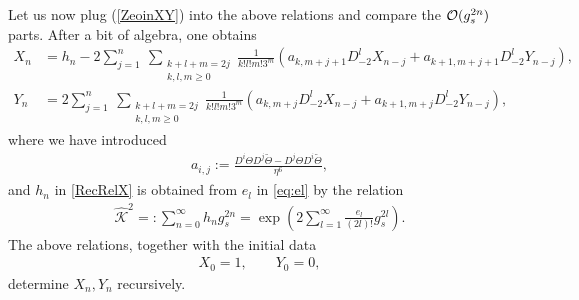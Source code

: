 \documentclass[11pt]{article}
\def\h#1{\widehat{#1}}
\renewcommand{\[}{\begin{eqnarray}}
\renewcommand{\]}{\end{eqnarray}}
\newcommand{\Thetaeven}{\Theta}
\newcommand{\Thetaodd}{{\widetilde{\Theta}}}
\newcommand{\heven}{h}
\begin{document}
%
Let us now plug (\ref{ZeoinXY}) into the above relations
and compare the ${\cal O}(g_s^{2n})$ parts.
After a bit of algebra, one obtains
%
\begin{align}
\label{RecRelX}
X_n &= \heven_n 
 -2\sum_{j=1}^n\ \sum_{\substack{k+l+m=2j\\ k,l,m\ge 0}}
 \frac{1}{k!l!m!3^m}
 \left(a_{k,m+j+1}D_{-2}^l X_{n-j}
      +a_{k+1,m+j+1}D_{-2}^l Y_{n-j}\right),\\
\label{RecRelY}
Y_n &=
  2\sum_{j=1}^n\ \sum_{\substack{k+l+m=2j\\ k,l,m\ge 0}}
 \frac{1}{k!l!m!3^m}
 \left(a_{k,m+j}D_{-2}^l X_{n-j}
      +a_{k+1,m+j}D_{-2}^l Y_{n-j}\right),
\end{align}
%
where we have introduced
%
\begin{align}
a_{i,j}:=
 \frac{D^i\Thetaeven D^j\Thetaodd-D^j\Thetaeven D^i\Thetaodd}{\eta^6},
\end{align}
and $\heven_n$
in \eqref{RecRelX} is obtained from $e_l$ in \eqref{eq:el} by the relation
%
\begin{align}
\label{GenRelheven}
 \h{\mathcal{K}}^2=:\sum_{n=0}^\infty \heven_n g_s^{2n}
=\exp\left(2\sum_{l=1}^\infty \frac{e_l}{(2l)!}g_s^{2l}\right).
\end{align}
%
The above relations, together with the initial data
%
\begin{align}
X_0=1,\qquad Y_0=0,
\end{align}
%
determine $X_n,Y_n$ recursively.
\end{document}
